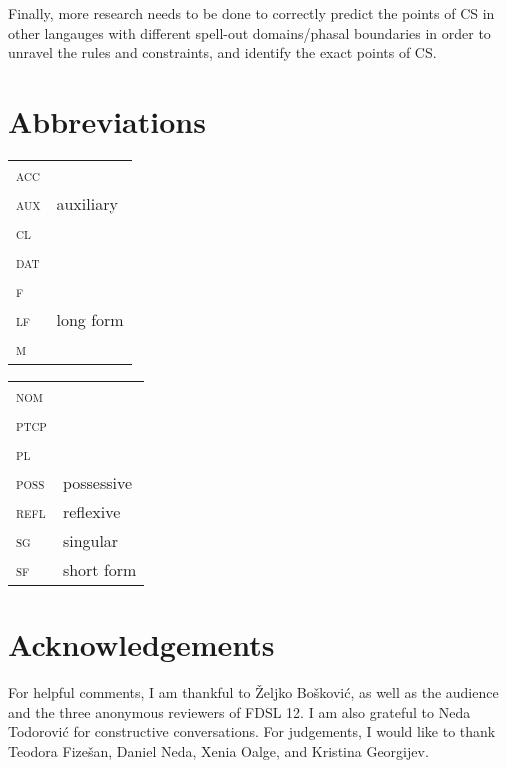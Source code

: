 \documentclass[output=paper,hidelinks,newtxmath,]{langscibook}
\begin{document}
\noindent Finally, more research needs to be done to correctly predict the points of CS in other langauges with different spell-out domains/phasal boundaries in order to unravel the rules and constraints, and identify the exact points of CS.




\section*{Abbreviations}

\begin{tabularx}{.5\textwidth}{@{}lQ@{}}
\textsc{acc}&\\
\textsc{aux}&auxiliary\\
\textsc{cl}&\\
\textsc{dat}&\\
\textsc{f}&\\
\textsc{lf}&long form\\
\textsc{m}&\\
\end{tabularx}%
\begin{tabularx}{.5\textwidth}{@{}lQ@{}}
\textsc{nom}&\\
\textsc{ptcp}&\\
\textsc{pl}&\\
\textsc{poss}&possessive\\
\textsc{refl}&reflexive\\
\textsc{sg}&singular\\
\textsc{sf}&short form\\
\end{tabularx}

\section*{Acknowledgements}

For helpful comments, I am thankful to Željko Bošković, as well as the audience and the three anonymous reviewers of FDSL 12. I am also grateful to Neda Todorović for constructive conversations. For judgements, I would like to thank Teodora Fizešan, Daniel Neda, Xenia Oalge, and Kristina Georgijev.

\sloppy
\printbibliography[heading=subbibliography,notkeyword=this]
\end{document}
